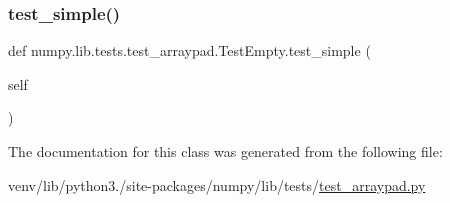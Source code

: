\mbox{\label{classnumpy_1_1lib_1_1tests_1_1test__arraypad_1_1TestEmpty_a490c2c15f89a54f1256ad9c55a209fcb}} 
\subsubsection{\texorpdfstring{test\+\_\+simple()}{test\_simple()}}
{\footnotesize\ttfamily def numpy.\+lib.\+tests.\+test\+\_\+arraypad.\+Test\+Empty.\+test\+\_\+simple (\begin{DoxyParamCaption}\item[{}]{self }\end{DoxyParamCaption})}



The documentation for this class was generated from the following file\+:\begin{DoxyCompactItemize}
\item 
venv/lib/python3./site-\/packages/numpy/lib/tests/\hyperlink{test__arraypad_8py}{test\+\_\+arraypad.\+py}\end{DoxyCompactItemize}
